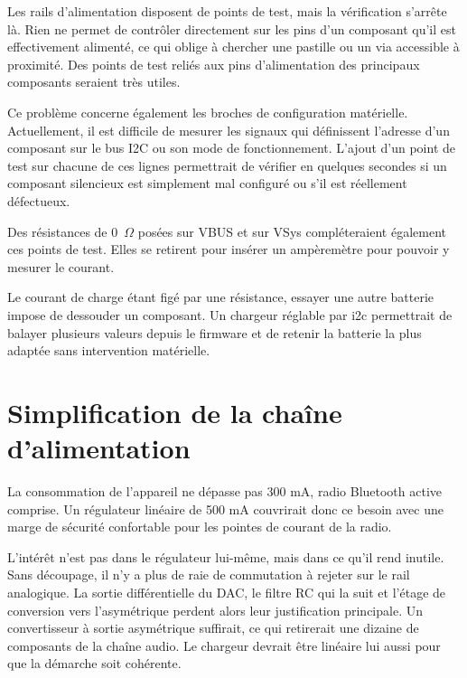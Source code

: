 Les rails d'alimentation disposent de points de test, mais la vérification s'arrête là. Rien ne permet de contrôler directement sur les pins d'un composant qu'il est effectivement alimenté, ce qui oblige à chercher une pastille ou un via accessible à proximité. Des points de test reliés aux pins d'alimentation des principaux composants seraient très utiles.

Ce problème concerne également les broches de configuration matérielle. Actuellement, il est difficile de mesurer les signaux qui définissent l'adresse d'un composant sur le bus I2C ou son mode de fonctionnement. L'ajout d'un point de test sur chacune de ces lignes permettrait de vérifier en quelques secondes si un composant silencieux est simplement mal configuré ou s'il est réellement défectueux.

Des résistances de 0~$\Omega$ posées sur VBUS et sur VSys compléteraient également ces points de test. Elles se retirent pour insérer un ampèremètre pour pouvoir y mesurer le courant.

Le courant de charge étant figé par une résistance, essayer une autre batterie impose de dessouder un composant. Un chargeur réglable par \gls{i2c} permettrait de balayer plusieurs valeurs depuis le firmware et de retenir la batterie la plus adaptée sans intervention matérielle.

\section{Simplification de la chaîne d'alimentation}
\label{sec:amel_alimentation}

La consommation de l'appareil ne dépasse pas 300 mA, radio Bluetooth active comprise. Un régulateur linéaire de 500 mA couvrirait donc ce besoin avec une marge de sécurité confortable pour les pointes de courant de la radio.

L'intérêt n'est pas dans le régulateur lui-même, mais dans ce qu'il rend inutile. Sans découpage, il n'y a plus de raie de commutation à rejeter sur le rail analogique. La sortie différentielle du \gls{DAC}, le filtre RC qui la suit et l'étage de conversion vers l'asymétrique perdent alors leur justification principale. Un convertisseur à sortie asymétrique suffirait, ce qui retirerait une dizaine de composants de la chaîne audio. Le chargeur devrait être linéaire lui aussi pour que la démarche soit cohérente.

